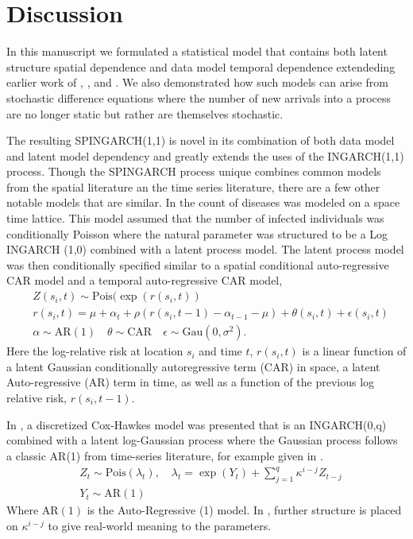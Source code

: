 \documentclass[11pt]{isuthesis}
\begin{document}
\section{Discussion}

In this manuscript we formulated a statistical model that contains both latent structure spatial dependence and data model temporal dependence extendeding earlier work of \cite{ferland2006integer}, \cite{fokianos2009poisson}, and \cite{davis2016theory}.  We also demonstrated how such models can arise from stochastic difference equations where the number of new arrivals into a process are no longer static but rather are themselves stochastic.

The resulting SPINGARCH(1,1) is novel in its combination of both data model and latent model dependency and greatly extends the uses of the INGARCH(1,1) process. 
Though the SPINGARCH process unique combines common models from the spatial literature an the time series literature, there are a few other notable models that are similar.  In \cite{martinez2008autoregressive} the count of diseases was modeled on a space time lattice.  This model assumed that the number of infected individuals was conditionally Poisson where the natural parameter was structured to be a Log INGARCH (1,0) combined with a latent process model.  The latent process model was then conditionally specified similar to a spatial conditional auto-regressive CAR model and a temporal auto-regressive CAR model,  
\begin{align}
	& Z(s_i,t)\sim \mbox{Pois}(\exp(r(s_i,t))\\
	& r(s_i,t) = \mu+\alpha_t + \rho \left(r(s_i,t-1) -\alpha_{t-1}-\mu\right) + \theta(s_i,t)+\epsilon(s_i,t)\\
	& \alpha \sim \mbox{AR}(1)
	\quad \theta \sim \mbox{CAR} \quad \epsilon \sim \mbox{Gau}(0,\sigma^2).
\end{align}
Here the log-relative risk at location $s_i$ and time $t$, $r(s_i,t)$ is a linear function of a latent Gaussian conditionally autoregressive term (CAR) in space, a latent Auto-regressive (AR) term in time, as well as a function of the previous log relative risk, $r(s_i,t-1)$.

In \cite{mohler2013modeling}, a discretized Cox-Hawkes model was presented that is an INGARCH(0,q) combined with a latent log-Gaussian process where the Gaussian process follows a classic AR(1) from time-series literature, for example given in \cite{shumway2010time}. 
\begin{align}
	& Z_t\sim \mbox{Pois}(\lambda_t),\quad \lambda_t=\exp(Y_t)+\sum_{j=1}^q \kappa^{i-j} Z_{t-j} \\
	& Y_t \sim \mbox{AR}(1)
\end{align}
Where $\mbox{AR}(1)$ is the Auto-Regressive (1) model.  In \cite{mohler2013modeling}, further structure is placed on $\kappa^{i-j}$ to give real-world meaning to the parameters.
\end{document}
